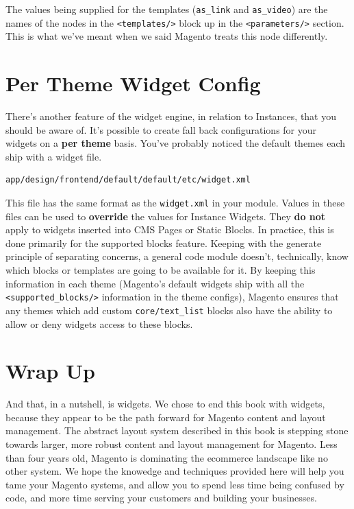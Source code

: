 \documentclass[oneside]{book}
\begin{document}
The values being supplied for the templates (\footnotesize\texttt{as\_link} \normalsize  and \footnotesize\texttt{as\_video}\normalsize) are the names of the nodes in the \footnotesize\texttt{<templates/>} \normalsize  block up in the \footnotesize\texttt{\textless parameters/\textgreater } \normalsize  section.  This is what we've meant when we said Magento treats this node differently.

\section{Per Theme Widget Config}

There's another feature of the widget engine, in relation to Instances, that you should be aware of.  It's possible to create fall back configurations for your widgets on a \textbf{per theme} basis.  You've probably noticed the default themes each ship with a widget file.

\begin{lstlisting}
app/design/frontend/default/default/etc/widget.xml

\end{lstlisting}


This file has the same format as the \footnotesize\texttt{widget.xml} \normalsize  in your module.  Values in these files can be used to \textbf{override} the values for Instance Widgets.  They \textbf{do not} apply to widgets inserted into CMS Pages or Static Blocks.  In practice, this is done primarily for the supported blocks feature.   Keeping with the generate principle of separating concerns, a general code module doesn't, technically, know which blocks or templates are going to be available for it.  By keeping this information in each theme (Magento's default widgets ship with all the \footnotesize\texttt{\textless supported\_blocks/\textgreater } \normalsize  information in the theme configs), Magento ensures that any themes which add custom \footnotesize\texttt{core/text\_list} \normalsize  blocks also have the ability to allow or deny widgets access to these blocks.

\section{Wrap Up}

And that, in a nutshell, is widgets.  We chose to end this book with widgets, because they appear to be the path forward for Magento content and layout management.  The abstract layout system described in this book is stepping stone towards larger, more robust content and layout management for Magento.  Less than four years old, Magento is dominating the ecommerce landscape like no other system. We hope the knowedge and techniques provided here will help you tame your Magento systems, and allow you to spend less time being confused by code, and more time serving your customers and building your businesses.
\end{document}
